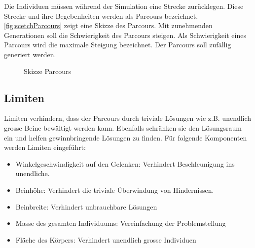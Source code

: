       Die Individuen müssen während der Simulation eine Strecke zurücklegen.
      Diese Strecke und ihre Begebenheiten werden als Parcours bezeichnet.
      \vref{fig:scetchParcours} zeigt eine Skizze des Parcours.
      Mit zunehmenden Generationen soll die Schwierigkeit des Parcours steigen.
      Als Schwierigkeit eines Parcours wird die maximale Steigung bezeichnet.
      Der Parcours soll zufällig generiert werden.

      \begin{figure}[H]
        
        \caption{Skizze Parcours\label{fig:scetchParcours}}
      \end{figure}

    \subsection{Limiten\label{sub:IntroReqLimit}}

      Limiten verhindern, dass der Parcours durch triviale Lösungen wie z.B. unendlich grosse Beine bewältigt werden kann.
      Ebenfalls schränken sie den Lösungsraum ein und helfen gewinnbringende Lösungen zu finden.
      Für folgende Komponenten werden Limiten eingeführt:
      \begin{itemize}
        \item Winkelgeschwindigkeit auf den Gelenken: Verhindert Beschleunigung ins unendliche.
        \item Beinhöhe: Verhindert die triviale Überwindung von Hindernissen.
        \item Beinbreite: Verhindert unbrauchbare Lösungen
        \item Masse des gesamten Individuums: Vereinfachung der Problemstellung
        \item Fläche des Körpers: Verhindert unendlich grosse Individuen
      \end{itemize}
